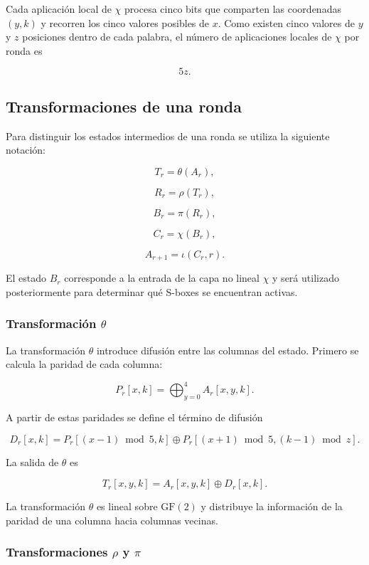 Cada aplicación local de $\chi$ procesa cinco bits que comparten las
coordenadas $(y,k)$ y recorren los cinco valores posibles de $x$. Como
existen cinco valores de $y$ y $z$ posiciones dentro de cada palabra, el
número de aplicaciones locales de $\chi$ por ronda es

\[
5z.
\]


\subsection{Transformaciones de una ronda}
\label{subsec:transformaciones_ronda}

Para distinguir los estados intermedios de una ronda se utiliza la siguiente
notación:

\[
T_r = \theta(A_r),
\]

\[
R_r = \rho(T_r),
\]

\[
B_r = \pi(R_r),
\]

\[
C_r = \chi(B_r),
\]

\[
A_{r+1} = \iota(C_r,r).
\]

El estado $B_r$ corresponde a la entrada de la capa no lineal $\chi$ y
será utilizado posteriormente para determinar qué S-boxes se encuentran
activas.


\subsubsection{Transformación \texorpdfstring{$\theta$}{theta}}

La transformación $\theta$ introduce difusión entre las columnas del
estado. Primero se calcula la paridad de cada columna:

\[
P_r[x,k]
=
\bigoplus_{y=0}^{4}
A_r[x,y,k].
\]

A partir de estas paridades se define el término de difusión

\[
D_r[x,k]
=
P_r[(x-1)\bmod 5,k]
\oplus
P_r[(x+1)\bmod 5,(k-1)\bmod z].
\]

La salida de $\theta$ es

\[
T_r[x,y,k]
=
A_r[x,y,k]
\oplus
D_r[x,k].
\]

La transformación $\theta$ es lineal sobre $\mathrm{GF}(2)$ y distribuye
la información de la paridad de una columna hacia columnas vecinas.


\subsubsection{Transformaciones \texorpdfstring{$\rho$}{rho} y
\texorpdfstring{$\pi$}{pi}}

